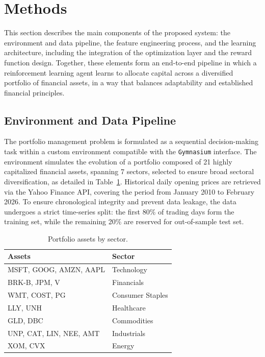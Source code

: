 \documentclass[final]{article}
\begin{document}
\section{Methods}
\label{sec:methods}
This section describes the main components of the proposed system: the environment and data pipeline, the feature
engineering process, and the learning architecture, including the integration of the optimization layer and the reward
function design.
Together, these elements form an end-to-end pipeline in which a reinforcement learning agent learns to allocate capital
across a diversified portfolio of financial assets, in a way that balances adaptability and established financial principles.

\subsection{Environment and Data Pipeline}
The portfolio management problem is formulated as a sequential decision-making task within a custom environment
compatible with the \texttt{Gymnasium} interface. The environment simulates the evolution of a portfolio composed of 21
highly capitalized financial assets, spanning 7 sectors, selected to ensure broad sectoral diversification, as detailed
in Table~\ref{tab:portfolio_assets}.
Historical daily opening prices are retrieved via the Yahoo Finance API, covering the period from January 2010 to
February 2026. To ensure chronological integrity and prevent data leakage, the data undergoes a strict time-series
split: the first 80\% of trading days form the training set, while the remaining 20\% are reserved for out-of-sample test set.

\begin{table}[h!]
    \centering
    \caption{Portfolio assets by sector.}
    \label{tab:portfolio_assets}
    \begin{tabular}{ll}
        \toprule
        \textbf{Assets} & \textbf{Sector} \\
        \midrule
        MSFT, GOOG, AMZN, AAPL & Technology \\
        BRK-B, JPM, V & Financials \\
        WMT, COST, PG & Consumer Staples \\
        LLY, UNH & Healthcare \\
        GLD, DBC & Commodities \\
        UNP, CAT, LIN, NEE, AMT & Industrials \\
        XOM, CVX & Energy \\
        \bottomrule
    \end{tabular}
\end{table}
\end{document}
